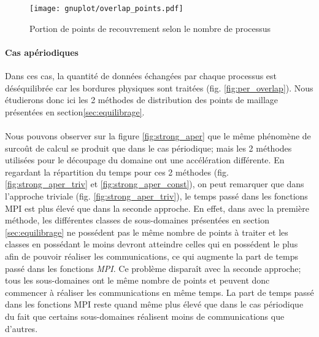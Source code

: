 \begin{figure}[ht]
  \centering
  \texttt{[image: gnuplot/overlap\_points.pdf]}
  \caption{\label{fig:overlap_points} Portion de points de recouvrement selon le nombre de processus}
\end{figure}



\paragraph{Cas apériodiques}
Dans ces cas, la quantité de données échangées par chaque processus est déséquilibrée car les bordures physiques sont traitées (fig. \ref{fig:per_overlap}). Nous étudierons donc ici les 2 méthodes de distribution des points de maillage présentées en section\ref{sec:equilibrage}.

\paragraph{}Nous pouvons observer sur la figure \ref{fig:strong_aper} que le même phénomène de surcoût de calcul se produit que dans le cas périodique; mais les 2 méthodes utilisées pour le découpage du domaine ont une accélération différente. En regardant la répartition du temps pour ces 2 méthodes (fig. \ref{fig:strong_aper_triv} et \ref{fig:strong_aper_const}), on peut remarquer que dans l'approche triviale (fig. \ref{fig:strong_aper_triv}), le temps passé dans les fonctions MPI est plus élevé que dans la seconde approche. En effet, dans avec la première méthode, les différentes classes de sous-domaines présentées en section \ref{sec:equilibrage} ne possédent pas le même nombre de points à traiter et les classes en possédant le moins devront atteindre celles qui en possédent le plus afin de pouvoir réaliser les communications, ce qui augmente la part de temps passé dans les fonctions \textit{MPI}. Ce problème disparaît avec la seconde approche; tous les sous-domaines ont le même nombre de points et peuvent donc commencer à réaliser les communications en même temps. La part de temps passé dans les fonctions MPI reste quand même plus élevé que dans le cas périodique du fait que certains sous-domaines réalisent moins de communications que d'autres.



